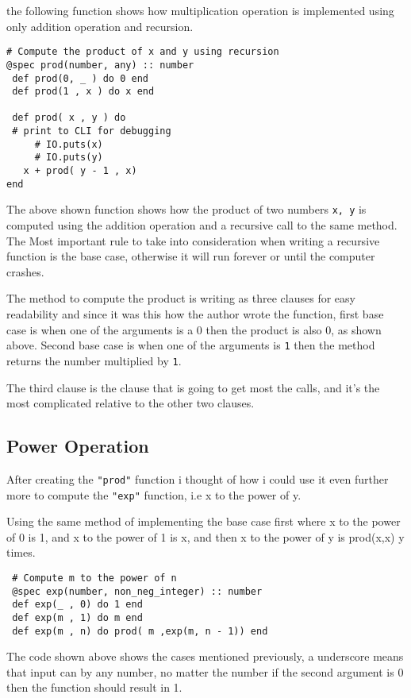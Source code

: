 \documentclass{article}
\begin{document}
the following function shows how multiplication operation is implemented using only addition operation and recursion.


\begin{verbatim}
# Compute the product of x and y using recursion
@spec prod(number, any) :: number
 def prod(0, _ ) do 0 end
 def prod(1 , x ) do x end
 
 def prod( x , y ) do
 # print to CLI for debugging
     # IO.puts(x)
     # IO.puts(y)
   x + prod( y - 1 , x)
end
\end{verbatim}

The above shown function shows how the product of two numbers {\tt x, y} is computed using the addition operation and a recursive call to the same method.
The Most important rule to take into consideration when writing a recursive function is the base case, otherwise it will run forever or until the computer crashes.

The method to compute the product is writing as three clauses for easy readability and since it was this how the author wrote the function, first base case is when one of the arguments is a 0 then the product is also 0, as shown above.
Second base case is when one of the arguments is {\tt 1} then the method returns the number multiplied by {\tt 1}.

The third clause is the clause that is going to get most the calls, and it's the most complicated relative to the other two clauses.
\subsection{Power Operation }

After creating the {\tt "prod"} function i thought of how i could use it even further more to compute the {\tt "exp"} function, i.e x to the power of y.

Using the same method of implementing the base case first where x to the power of 0 is 1, and x to the power of 1 is x, and then x to the power of y is prod(x,x) y times.

\begin{verbatim}
 # Compute m to the power of n
 @spec exp(number, non_neg_integer) :: number
 def exp(_ , 0) do 1 end
 def exp(m , 1) do m end
 def exp(m , n) do prod( m ,exp(m, n - 1)) end

\end{verbatim}

The code shown above shows the cases mentioned previously, a underscore means that input can by any number, no matter the number if the second argument is 0 then the function should result in 1. 
\end{document}
